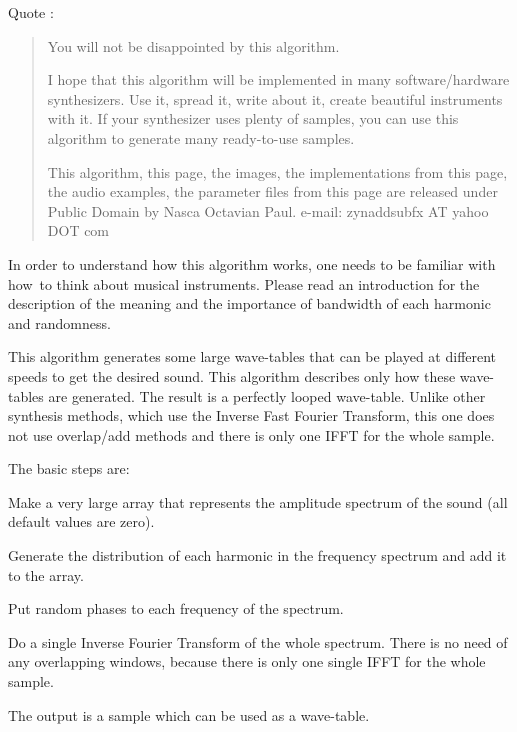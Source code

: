    Quote \cite{zyndoc}:

   \begin{quotation}
      You will not be disappointed by this algorithm.

      I hope that this algorithm will be implemented in many software/hardware
      synthesizers. Use it, spread it, write about it, create beautiful
      instruments with it. If your synthesizer uses plenty of samples, you can
      use this algorithm to generate many ready-to-use samples.

      This algorithm, this page, the images, the implementations from this
      page, the audio examples, the parameter files from this page
      are released under Public Domain by Nasca Octavian Paul.
      e-mail: zynaddsubfx AT yahoo DOT com
   \end{quotation}

   In order to understand how this algorithm works, one needs to be familiar
   with how to think about musical instruments. Please read an introduction
   for the description of the meaning and the importance of bandwidth of each
   harmonic and randomness.

   This algorithm generates some large wave-tables that can be played at
   different speeds to get the desired sound. This algorithm describes only
   how these wave-tables are generated. The result is a perfectly looped
   wave-table.  Unlike other synthesis methods, which use the
   Inverse Fast Fourier Transform, this one does not use overlap/add methods
   and there is only one IFFT for the whole sample.

   The basic steps are:

   \begin{enumber}
      \item Make a very large array that represents the amplitude spectrum of
         the sound (all default values are zero).
      \item Generate the distribution of each harmonic in the frequency
         spectrum and add it to the array.
      \item Put random phases to each frequency of the spectrum.
      \item Do a single Inverse Fourier Transform of the whole spectrum. There
         is no need of any overlapping windows, because there is only one
         single IFFT for the whole sample.
   \end{enumber}

   The output is a sample which can be used as a wave-table.

